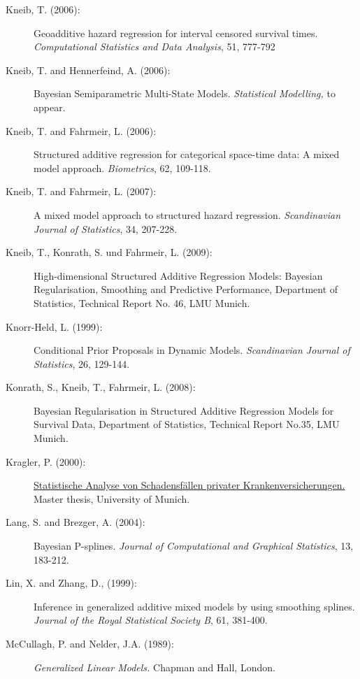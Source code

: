 \documentclass[11pt,a4paper,twoside]{bayesxarticle}
\begin{document}
\begin{description}
\item[Kneib, T. (2006):] Geoadditive hazard regression for interval
censored survival times. {\em Computational Statistics and Data
Analysis}, 51, 777-792

\item[Kneib, T. and Hennerfeind, A. (2006):] Bayesian Semiparametric
Multi-State Models. {\em Statistical Modelling,} to appear.

\item[Kneib, T. and Fahrmeir, L. (2006):] Structured additive
regression for categorical space-time data: A mixed model approach.
{\it Biometrics}, 62, 109-118.

\item[Kneib, T. and Fahrmeir, L. (2007):] A mixed model approach
to structured hazard regression. {\em Scandinavian Journal of
Statistics}, 34, 207-228.

\item[Kneib, T., Konrath, S. und Fahrmeir, L. (2009):] High-dimensional 
Structured Additive Regression Models: Bayesian Regularisation, Smoothing and Predictive 
Performance, Department of Statistics, Technical Report No. 46, LMU Munich.

\item[Knorr-Held, L. (1999):] Conditional Prior Proposals in
Dynamic Models. {\em Scandinavian Journal of Statistics}, 26,
129-144.

\item[Konrath, S., Kneib, T., Fahrmeir, L. (2008):] Bayesian Regularisation 
in Structured Additive Regression Models for Survival Data, Department of Statistics, 
Technical Report No.35, LMU Munich.

\item[Kragler, P. (2000):] \href{http://www.scor.fr/us/2_laureat.asp?pays=2}
{Statistische Analyse von Schadensf\"allen privater
Krankenversicherungen.} Master thesis, University of Munich.

\item[Lang, S. and Brezger, A. (2004):] Bayesian P-splines. {\it
Journal of Computational and Graphical Statistics}, 13, 183-212.

\item[Lin, X. and Zhang, D., (1999):]
Inference in generalized additive mixed models by using smoothing
splines. {\it Journal of the Royal Statistical Society B}, 61,
381-400.

\item[McCullagh, P. and Nelder, J.A. (1989):] {\em Generalized Linear Models.} Chapman and Hall, London.


\end{description}
\end{document}
